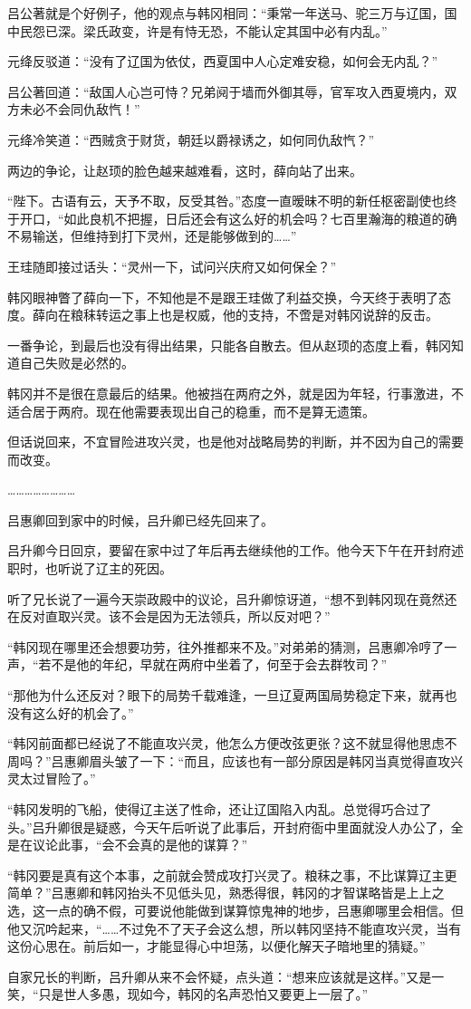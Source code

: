 吕公著就是个好例子，他的观点与韩冈相同：“秉常一年送马、驼三万与辽国，国中民怨已深。梁氏政变，许是有恃无恐，不能认定其国中必有内乱。”

元绛反驳道：“没有了辽国为依仗，西夏国中人心定难安稳，如何会无内乱？”

吕公著回道：“敌国人心岂可恃？兄弟阋于墙而外御其辱，官军攻入西夏境内，双方未必不会同仇敌忾！”

元绛冷笑道：“西贼贪于财货，朝廷以爵禄诱之，如何同仇敌忾？”

两边的争论，让赵顼的脸色越来越难看，这时，薛向站了出来。

“陛下。古语有云，天予不取，反受其咎。”态度一直暧昧不明的新任枢密副使也终于开口，“如此良机不把握，日后还会有这么好的机会吗？七百里瀚海的粮道的确不易输送，但维持到打下灵州，还是能够做到的……”

王珪随即接过话头：“灵州一下，试问兴庆府又如何保全？”

韩冈眼神瞥了薛向一下，不知他是不是跟王珪做了利益交换，今天终于表明了态度。薛向在粮秣转运之事上也是权威，他的支持，不啻是对韩冈说辞的反击。

一番争论，到最后也没有得出结果，只能各自散去。但从赵顼的态度上看，韩冈知道自己失败是必然的。

韩冈并不是很在意最后的结果。他被挡在两府之外，就是因为年轻，行事激进，不适合居于两府。现在他需要表现出自己的稳重，而不是算无遗策。

但话说回来，不宜冒险进攻兴灵，也是他对战略局势的判断，并不因为自己的需要而改变。

……………………

吕惠卿回到家中的时候，吕升卿已经先回来了。

吕升卿今日回京，要留在家中过了年后再去继续他的工作。他今天下午在开封府述职时，也听说了辽主的死因。

听了兄长说了一遍今天崇政殿中的议论，吕升卿惊讶道，“想不到韩冈现在竟然还在反对直取兴灵。该不会是因为无法领兵，所以反对吧？”

“韩冈现在哪里还会想要功劳，往外推都来不及。”对弟弟的猜测，吕惠卿冷哼了一声，“若不是他的年纪，早就在两府中坐着了，何至于会去群牧司？”

“那他为什么还反对？眼下的局势千载难逢，一旦辽夏两国局势稳定下来，就再也没有这么好的机会了。”

“韩冈前面都已经说了不能直攻兴灵，他怎么方便改弦更张？这不就显得他思虑不周吗？”吕惠卿眉头皱了一下：“而且，应该也有一部分原因是韩冈当真觉得直攻兴灵太过冒险了。”

“韩冈发明的飞船，使得辽主送了性命，还让辽国陷入内乱。总觉得巧合过了头。”吕升卿很是疑惑，今天午后听说了此事后，开封府衙中里面就没人办公了，全是在议论此事，“会不会真的是他的谋算？”

“韩冈要是真有这个本事，之前就会赞成攻打兴灵了。粮秣之事，不比谋算辽主更简单？”吕惠卿和韩冈抬头不见低头见，熟悉得很，韩冈的才智谋略皆是上上之选，这一点的确不假，可要说他能做到谋算惊鬼神的地步，吕惠卿哪里会相信。但他又沉吟起来，“……不过免不了天子会这么想，所以韩冈坚持不能直攻兴灵，当有这份心思在。前后如一，才能显得心中坦荡，以便化解天子暗地里的猜疑。”

自家兄长的判断，吕升卿从来不会怀疑，点头道：“想来应该就是这样。”又是一笑，“只是世人多愚，现如今，韩冈的名声恐怕又要更上一层了。”

